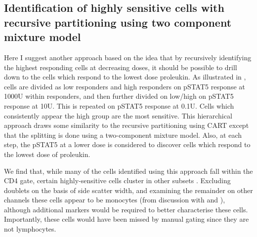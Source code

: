 \subsection{Identification of highly sensitive cells with recursive partitioning using two component mixture model}

Here I suggest another approach based on the idea that by recursively identifying the highest responding cells at decreasing doses, it should be
possible to drill down to the cells which respond to the lowest dose proleukin.
As illustrated in , cells are divided as low responders and high responders on pSTAT5 response at 1000U 
within responders, and then further divided on low/high on pSTAT5 response at 10U.
This is repeated on pSTAT5 response at 0.1U.
Cells which consistently appear the high group are the most sensitive.
This hierarchical approach draws some similarity to the recursive partitioning using \gls{CART} except that the splitting is done using a two-component mixture model.
Also, at each step, the pSTAT5 at a lower dose is considered to discover cells which respond to the lowest dose of proleukin.

We find that, while many of the cells identified using this approach fall within the CD4 gate,
certain highly-sensitive cells cluster in other subsets .
Excluding doublets on the basis of side scatter width,
and examining the remainder on other channels these cells appear to be monocytes (from discussion with  and ),
although additional markers would be required to better characterise these cells.
Importantly, these cells would have been missed by manual gating since they are not lymphocytes.



